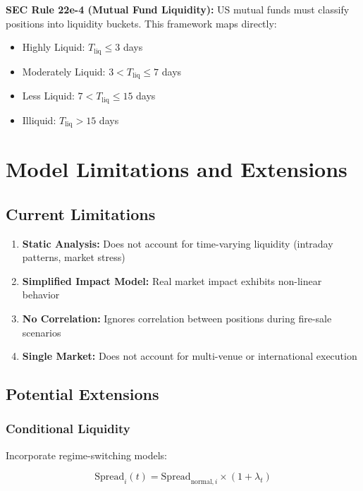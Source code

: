 \documentclass[11pt,a4paper]{article}
\begin{document}
\textbf{SEC Rule 22e-4 (Mutual Fund Liquidity):}
US mutual funds must classify positions into liquidity buckets. This framework maps directly:
\begin{itemize}
    \item Highly Liquid: $T_{\text{liq}} \leq 3$ days
    \item Moderately Liquid: $3 < T_{\text{liq}} \leq 7$ days
    \item Less Liquid: $7 < T_{\text{liq}} \leq 15$ days
    \item Illiquid: $T_{\text{liq}} > 15$ days
\end{itemize}

\section{Model Limitations and Extensions}

\subsection{Current Limitations}

\begin{enumerate}
    \item \textbf{Static Analysis:} Does not account for time-varying liquidity (intraday patterns, market stress)
    \item \textbf{Simplified Impact Model:} Real market impact exhibits non-linear behavior
    \item \textbf{No Correlation:} Ignores correlation between positions during fire-sale scenarios
    \item \textbf{Single Market:} Does not account for multi-venue or international execution
\end{enumerate}

\subsection{Potential Extensions}

\subsubsection{Conditional Liquidity}

Incorporate regime-switching models:

\begin{equation}
\text{Spread}_i(t) = \text{Spread}_{\text{normal},i} \times \left(1 + \lambda_t \right)
\end{equation}
\end{document}
